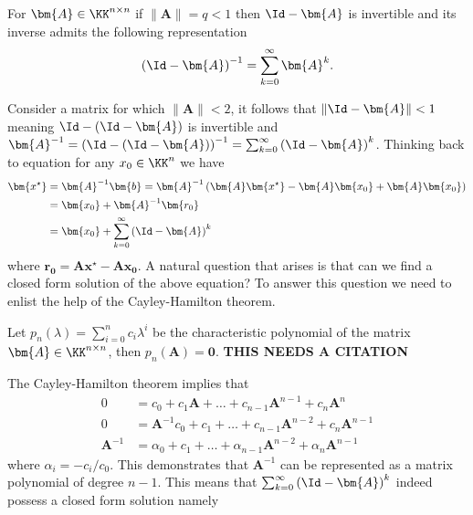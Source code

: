 \begin{thm} \label{theorem: invert_mat_norm}
    For $\bm{A} \in \KK^{n \times n}$ if $\| \bm{A} \| = q < 1$ then $\Id - \bm{A}$ is invertible and its inverse admits the following representation
    \[
        \left( \Id - \bm{A} \right)^{-1} = \sum_{k=0}^{\infty} \bm{A}^k.
    \]
    \cite{BerezanskyMakarovich1996FaV1}
\end{thm}
Consider a matrix for which $\| \bm{A} \| < 2$, it follows that $\| \Id - \bm{A} \| < 1$ meaning $\Id - \left( \Id - \bm{A} \right)$ is invertible and $\bm{A}^{-1} = \left( \Id - \left( \Id - \bm{A} \right) \right)^{-1} = \sum_{k=0}^{\infty} \left( \Id - \bm{A} \right)^{k}$. Thinking back to equation   for any $x_0 \in \KK^{n}$ we have
\begin{align*}
    \bm{x^{\star}} & = \bm{A}^{-1} \bm{b} = \bm{A}^{-1} \left( \bm{A} \bm{x^{\star}} - \bm{A} \bm{x_0} + \bm{A} \bm{x_0} \right) \\
                   & = \bm{x_0} + \bm{A}^{-1} \bm{r_0}                                                                           \\
                   & = \bm{x_0} + \sum_{k=0}^{\infty} \left( \Id - \bm{A} \right)^k
\end{align*}
where $\bm{r_0} = \bm{A} \bm{x^{\star}} - \bm{A} \bm{x_0}$. A natural question that arises is that can we find a closed form solution of the above equation? To answer this question we need to enlist the help of the Cayley-Hamilton theorem.
\begin{thm} \label{theorem: cayley_amilton}
    Let $p_n \left( \lambda \right) = \sum_{i=0}^{n} c_i \lambda^{i}$ be the characteristic polynomial of the matrix $\bm{A} \in \KK^{n \times n}$, then $p_n \left( \bm{A} \right) = \bm{0}$. {\color{red} \textbf{THIS NEEDS A CITATION}}
\end{thm}
The Cayley-Hamilton theorem implies that
\begin{align*}
    0           & = c_0 + c_1 \bm{A} + \ldots + c_{n-1} \bm{A}^{n-1} + c_{n} \bm{A}^{n}           \\
    0           & = \bm{A}^{-1} c_0 + c_1 + \ldots + c_{n-1} \bm{A}^{n-2} + c_{n} \bm{A}^{n-1}    \\
    \bm{A}^{-1} & = \alpha_0 + c_1 + \ldots + \alpha_{n-1} \bm{A}^{n-2} + \alpha_{n} \bm{A}^{n-1}
\end{align*}
where $\alpha_i = -c_i / c_0$. This demonstrates that $\bm{A}^{-1}$ can be represented as a matrix polynomial of degree $n-1$. This means that $\sum_{k=0}^{\infty} \left( \Id - \bm{A} \right)^k$ indeed possess a closed form solution namely
